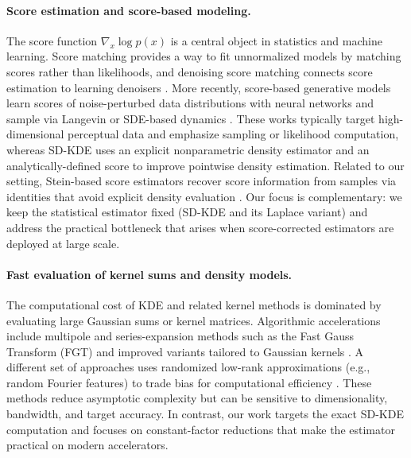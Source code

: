 \paragraph{Score estimation and score-based modeling.}
The score function $\nabla_x \log p(x)$ is a central object in statistics and machine learning.
Score matching \citep{hyvarinen2005score} provides a way to fit unnormalized models by matching scores rather than likelihoods, and denoising score matching connects score estimation to learning denoisers \citep{vincent2011connection}.
More recently, score-based generative models learn scores of noise-perturbed data distributions with neural networks and sample via Langevin or SDE-based dynamics \citep{song2019generative, song2021sde, ho2020ddpm}.
These works typically target high-dimensional perceptual data and emphasize sampling or likelihood computation, whereas SD-KDE uses an explicit nonparametric density estimator and an analytically-defined score to improve pointwise density estimation.
Related to our setting, Stein-based score estimators recover score information from samples via identities that avoid explicit density evaluation \citep{li2017gradient}.
Our focus is complementary: we keep the statistical estimator fixed (SD-KDE and its Laplace variant) and address the practical bottleneck that arises when score-corrected estimators are deployed at large scale.

\paragraph{Fast evaluation of kernel sums and density models.}
The computational cost of KDE and related kernel methods is dominated by evaluating large Gaussian sums or kernel matrices.
Algorithmic accelerations include multipole and series-expansion methods such as the Fast Gauss Transform (FGT) \citep{greengard1991fast} and improved variants tailored to Gaussian kernels \citep{yang2003improved}.
A different set of approaches uses randomized low-rank approximations (e.g., random Fourier features) to trade bias for computational efficiency \citep{rahimi2007random}.
These methods reduce asymptotic complexity but can be sensitive to dimensionality, bandwidth, and target accuracy.
In contrast, our work targets the exact SD-KDE computation and focuses on constant-factor reductions that make the estimator practical on modern accelerators.

